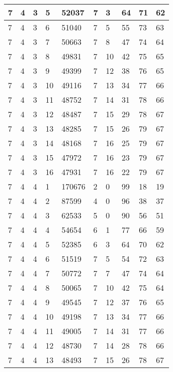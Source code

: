 \begin{table}[!ht]
\begin{tabular}{|l|l|l|l|l|l|l|l|l|l|}
        7 & 4 & 3 & 5 & 52037 & 7 & 3 & 64 & 71 & 62 \\ \hline
        7 & 4 & 3 & 6 & 51040 & 7 & 5 & 55 & 73 & 63 \\ \hline
        7 & 4 & 3 & 7 & 50663 & 7 & 8 & 47 & 74 & 64 \\ \hline
        7 & 4 & 3 & 8 & 49831 & 7 & 10 & 42 & 75 & 65 \\ \hline
        7 & 4 & 3 & 9 & 49399 & 7 & 12 & 38 & 76 & 65 \\ \hline
        7 & 4 & 3 & 10 & 49116 & 7 & 13 & 34 & 77 & 66 \\ \hline
        7 & 4 & 3 & 11 & 48752 & 7 & 14 & 31 & 78 & 66 \\ \hline
        7 & 4 & 3 & 12 & 48487 & 7 & 15 & 29 & 78 & 67 \\ \hline
        7 & 4 & 3 & 13 & 48285 & 7 & 15 & 26 & 79 & 67 \\ \hline
        7 & 4 & 3 & 14 & 48168 & 7 & 16 & 25 & 79 & 67 \\ \hline
        7 & 4 & 3 & 15 & 47972 & 7 & 16 & 23 & 79 & 67 \\ \hline
        7 & 4 & 3 & 16 & 47931 & 7 & 16 & 22 & 79 & 67 \\ \hline
        7 & 4 & 4 & 1 & 170676 & 2 & 0 & 99 & 18 & 19 \\ \hline
        7 & 4 & 4 & 2 & 87599 & 4 & 0 & 96 & 38 & 37 \\ \hline
        7 & 4 & 4 & 3 & 62533 & 5 & 0 & 90 & 56 & 51 \\ \hline
        7 & 4 & 4 & 4 & 54654 & 6 & 1 & 77 & 66 & 59 \\ \hline
        7 & 4 & 4 & 5 & 52385 & 6 & 3 & 64 & 70 & 62 \\ \hline
        7 & 4 & 4 & 6 & 51519 & 7 & 5 & 54 & 72 & 63 \\ \hline
        7 & 4 & 4 & 7 & 50772 & 7 & 7 & 47 & 74 & 64 \\ \hline
        7 & 4 & 4 & 8 & 50065 & 7 & 10 & 42 & 75 & 64 \\ \hline
        7 & 4 & 4 & 9 & 49545 & 7 & 12 & 37 & 76 & 65 \\ \hline
        7 & 4 & 4 & 10 & 49198 & 7 & 13 & 34 & 77 & 66 \\ \hline
        7 & 4 & 4 & 11 & 49005 & 7 & 14 & 31 & 77 & 66 \\ \hline
        7 & 4 & 4 & 12 & 48730 & 7 & 14 & 28 & 78 & 66 \\ \hline
        7 & 4 & 4 & 13 & 48493 & 7 & 15 & 26 & 78 & 67 \\ \hline

\end{tabular}
\end{table}

